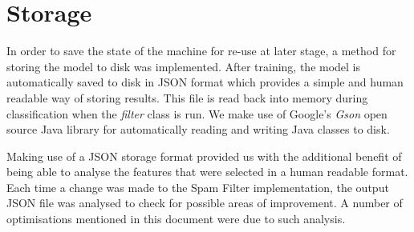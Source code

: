 \section{Storage}

In order to save the state of the machine for re-use at later stage, a method for storing the model to disk was implemented. After training, the model is automatically saved to disk in JSON format which provides a simple and human readable way of storing results. This file is read back into memory during classification when the \emph{filter} class is run. We make use of Google's \emph{Gson} open source Java library \cite{google:gson} for automatically reading and writing Java classes to disk. 

Making use of a JSON storage format provided us with the additional benefit of being able to analyse the features that were selected in a human readable format. Each time a change was made to the Spam Filter implementation, the output JSON file was analysed to check for possible areas of improvement. A number of optimisations mentioned in this document were due to such analysis.
